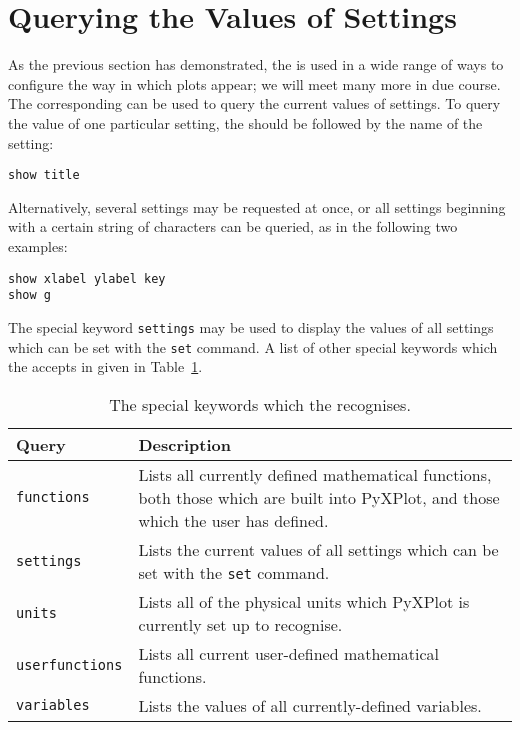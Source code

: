 \section{Querying the Values of Settings}

As the previous section has demonstrated, the  is used in a wide
range of ways to configure the way in which plots appear; we will meet many
more in due course. The corresponding  can be used to query the
current values of settings. To query the value of one particular setting, the
 should be followed by the name of the setting:

\begin{verbatim}
show title
\end{verbatim}

\noindent Alternatively, several settings may be requested at once, or all
settings beginning with a certain string of characters can be queried, as in
the following two examples:

\begin{verbatim}
show xlabel ylabel key
show g
\end{verbatim}

\noindent The special keyword {\tt settings} may be used to display the values
of all settings which can be set with the {\tt set} command. A list of other
special keywords which the  accepts in given in
Table~\ref{tab:show_keywords}.

\begin{table}
\begin{center}
\begin{tabular}{|lp{9cm}|}
\hline
{\bf Query} & {\bf Description} \\ \hline
{\tt functions} & Lists all currently defined mathematical functions, both those which are built into PyXPlot, and those which the user has defined.\\
{\tt settings} & Lists the current values of all settings which can be set with the {\tt set} command.\\
{\tt units} & Lists all of the physical units which PyXPlot is currently set up to recognise.\\
{\tt userfunctions} & Lists all current user-defined mathematical functions.\\
{\tt variables} & Lists the values of all currently-defined variables.\\
\hline
\end{tabular}
\end{center}
\caption{The special keywords which the  recognises.}
\label{tab:show_keywords}
\end{table}

